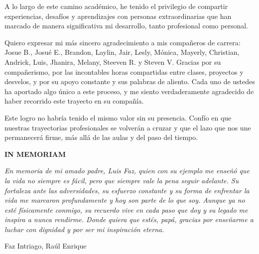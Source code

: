 A lo largo de este camino académico, he tenido el privilegio de compartir experiencias, desafíos y aprendizajes con personas extraordinarias que han marcado de manera significativa mi desarrollo, tanto profesional como personal.

Quiero expresar mi más sincero agradecimiento a mis compañeros de carrera: Josue B., Josué E., Brandon, Laylin, Jair, Lesly, Mónica, Mayerly, Christian, Andrick, Luis, Jhanira, Melany, Steeven R. y Steven V.  Gracias por su compañerismo, por las incontables horas compartidas entre clases, proyectos y desvelos, y por su apoyo constante y sus palabras de aliento. Cada uno de ustedes ha aportado algo único a este proceso, y me siento verdaderamente agradecido de haber recorrido este trayecto en su compañía.

Este logro no habría tenido el mismo valor sin su presencia. Confío en que nuestras trayectorias profesionales se volverán a cruzar y que el lazo que nos une permanecerá firme, más allá de las aulas y del paso del tiempo.

\vspace{1.5cm}  %

\begin{center}
{\normalsize \textbf{IN MEMORIAM}}
\end{center}

\begin{flushright}
\begin{minipage}{0.6\textwidth}
\textit{En memoria de mi amado padre, Luis Faz, quien con su ejemplo me enseñó que la vida no siempre es fácil, pero que siempre vale la pena seguir adelante. Su fortaleza ante las adversidades, su esfuerzo constante y su forma de enfrentar la vida me marcaron profundamente y hoy son parte de lo que soy. Aunque ya no esté físicamente conmigo, su recuerdo vive en cada paso que doy y su legado me inspira a nunca rendirme. Donde quiera que estés, papá, gracias por enseñarme a luchar con dignidad y por ser mi inspiración eterna.}
\end{minipage}
\end{flushright}
\vspace{1cm}
\begin{flushright}
Faz Intriago, Raúl Enrique
\end{flushright}
